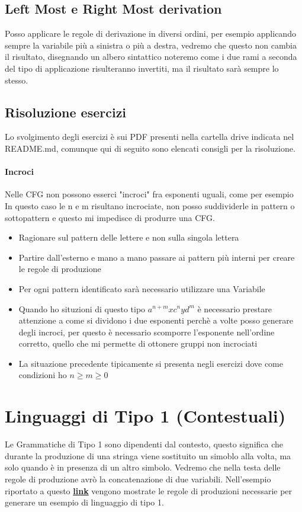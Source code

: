 \documentclass[12pt, a4paper, openany]{book}
\begin{document}
\subsection*{Left Most e Right Most derivation}
Posso applicare le regole di derivazione in diversi ordini, per esempio applicando sempre la variabile più
a sinistra o più a destra, vedremo che questo non cambia il risultato, disegnando un albero sintattico noteremo
come i due rami a seconda del tipo di applicazione risulteranno invertiti, ma il risultato sarà sempre lo stesso.
\subsection*{Risoluzione esercizi}
Lo svolgimento degli esercizi è sui PDF presenti nella cartella drive indicata nel README.md, comunque
qui di seguito sono elencati consigli per la risoluzione.
\paragraph*{Incroci} Nelle CFG non possono esserci "incroci" fra esponenti uguali, come per esempio
 In questo caso le n e m risultano incrociate, non posso suddividerle in pattern o
sottopattern e questo mi impedisce di produrre una CFG.
\begin{itemize}
    \item Ragionare sul pattern delle lettere e non sulla singola lettera
    \item Partire dall'esterno e mano a mano passare ai pattern più interni per creare le regole di produzione
    \item Per ogni pattern identificato sarà necessario utilizzare una Variabile
    \item Quando ho situzioni di questo tipo $a^{n+m}xc^n y d^m$ è necessario prestare attenzione a
    come si dividono i due esponenti perchè a volte posso generare degli incroci, per questo è necessario
    scomporre l'esponente nell'ordine corretto, quello che mi permette di ottonere gruppi non incrociati
    \item La situazione precedente tipicamente si presenta negli esercizi dove come condizioni ho $n \geq m \geq 0$
\end{itemize}

\section{Linguaggi di Tipo 1 (Contestuali)}
Le Grammatiche di Tipo 1 sono dipendenti dal contesto, questo significa che durante
la produzione di una stringa viene sostituito un simoblo alla volta, ma solo quando
è in presenza di un altro simbolo. Vedremo che nella testa delle regole di produzione
avrò la concatenazione di due variabili.
Nell'esempio riportato a questo 
{\href{https://elearning.unimib.it/pluginfile.php/1366772/mod_resource/content/3/grammatiche-tipo-1.pdf}{\textbf{link}}}
vengono mostrate le regole di produzioni necessarie per generare un esempio di linguaggio
di tipo 1. 
\end{document}

